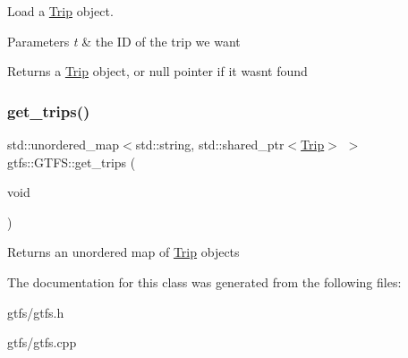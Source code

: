 Load a \hyperlink{classgtfs_1_1Trip}{Trip} object. 
\begin{DoxyParams}{Parameters}
{\em t} & the ID of the trip we want \\
\hline
\end{DoxyParams}
\begin{DoxyReturn}{Returns}
a \hyperlink{classgtfs_1_1Trip}{Trip} object, or null pointer if it wasn\textquotesingle{}t found 
\end{DoxyReturn}
\mbox{\label{classgtfs_1_1GTFS_ad526fc627fe1ce81b8a669f6187be0c0}} 
\subsubsection{\texorpdfstring{get\+\_\+trips()}{get\_trips()}}
{\footnotesize\ttfamily std\+::unordered\+\_\+map$<$std\+::string, std\+::shared\+\_\+ptr$<$\hyperlink{classgtfs_1_1Trip}{Trip}$>$ $>$ gtfs\+::\+G\+T\+F\+S\+::get\+\_\+trips (\begin{DoxyParamCaption}\item[{void}]{ }\end{DoxyParamCaption})\hspace{0.3cm}{\ttfamily [inline]}}

\begin{DoxyReturn}{Returns}
an unordered map of \hyperlink{classgtfs_1_1Trip}{Trip} objects 
\end{DoxyReturn}


The documentation for this class was generated from the following files\+:\begin{DoxyCompactItemize}
\item 
gtfs/gtfs.\+h\item 
gtfs/gtfs.\+cpp\end{DoxyCompactItemize}
